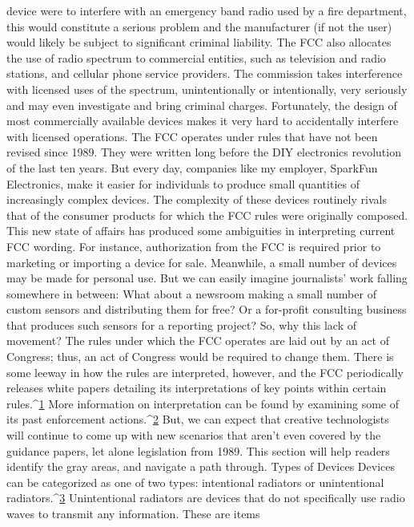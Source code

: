 device were to interfere with an emergency band radio used by a fire department,
this would constitute a serious problem and the manufacturer (if not
the user) would likely be subject to significant criminal liability.
The FCC also allocates the use of radio spectrum to commercial entities,
such as television and radio stations, and cellular phone service providers.
The commission takes interference with licensed uses of the spectrum,
unintentionally or intentionally, very seriously and may even investigate
and bring criminal charges. Fortunately, the design of most commercially
available devices makes it very hard to accidentally interfere with
licensed operations.
The FCC operates under rules that have not been revised since 1989. They
were written long before the DIY electronics revolution of the last ten years.
But every day, companies like my employer, SparkFun Electronics, make it
easier for individuals to produce small quantities of increasingly complex
devices. The complexity of these devices routinely rivals that of the consumer
products for which the FCC rules were originally composed.
This new state of affairs has produced some ambiguities in interpreting current
FCC wording. For instance, authorization from the FCC is required
prior to marketing or importing a device for sale. Meanwhile, a small
number of devices may be made for personal use. But we can easily imagine
journalists' work falling somewhere in between: What about a newsroom
making a small number of custom sensors and distributing them for
free? Or a for-profit consulting business that produces such sensors for a
reporting project?
So, why this lack of movement? The rules under which the FCC operates are
laid out by an act of Congress; thus, an act of Congress would be required
to change them. There is some leeway in how the rules are interpreted, however,
and the FCC periodically releases white papers detailing its interpretations
of key points within certain rules.^{\href{#endnotes-hord}{1}} More information on interpretation can be found by examining some of its past enforcement actions.^{\href{#endnotes-hord}{2}} But, we
can expect that creative technologists will continue to come up with new
scenarios that aren't even covered by the guidance papers, let alone legislation
from 1989. This section will help readers identify the gray areas, and
navigate a path through.
Types of Devices
Devices can be categorized as one of two types: intentional radiators or
unintentional radiators.^{\href{#endnotes-hord}{3}} Unintentional radiators are devices that do not
specifically use radio waves to transmit any information. These are items
